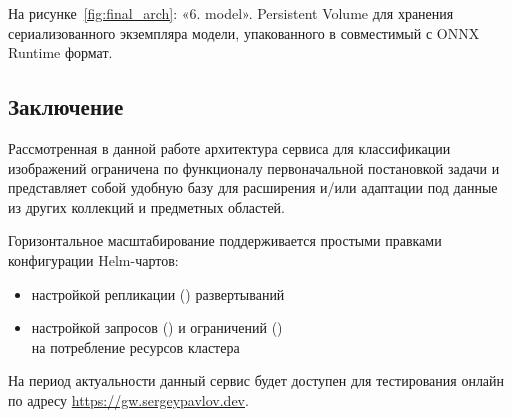 \documentclass[a4paper,12pt]{extarticle}
\begin{document}
На рисунке~\ref{fig:final_arch}: «6. model». Persistent Volume для хранения сериализованного
экземпляра модели, упакованного в совместимый с ONNX Runtime формат.

\subsection{Заключение}

Рассмотренная в данной работе архитектура сервиса для классификации изображений ограничена по
функционалу первоначальной постановкой задачи и представляет собой удобную базу для расширения и/или
адаптации под данные из других коллекций и предметных областей.

Горизонтальное масштабирование поддерживается простыми правками конфигурации Helm-чартов:

\begin{itemize}
	\item настройкой репликации () развертываний~\cite{scaling}
	\item настройкой запросов () и ограничений ()\\
	на потребление ресурсов кластера~\cite{resources}
\end{itemize}

На период актуальности данный сервис будет доступен для тестирования онлайн по адресу
\url{https://gw.sergeypavlov.dev}.

\newpage 
\printbibliography[heading=bibintoc] 
	
\end{document}
